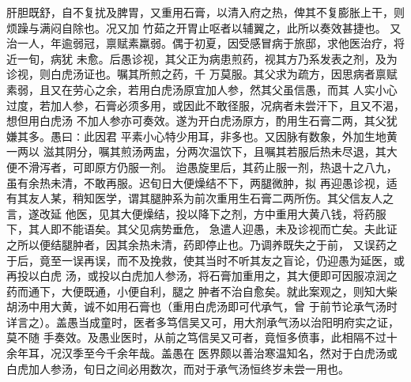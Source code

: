 \documentclass[a4paper,12pt,UTF8,twoside]{ctexbook}
\begin{document}
肝胆既舒，自不复扰及脾胃，又重用石膏，以清入府之热，俾其不复膨胀上干，则烦躁与满闷自除也。况又加 
竹茹之开胃止呕者以辅翼之，此所以奏效甚捷也。 
又治一人，年逾弱冠，禀赋素羸弱。偶于初夏，因受感冒病于旅邸，求他医治疗，将近一旬，病犹 
未愈。后愚诊视，其父正为病患煎药，视其方乃系发表之剂，及为诊视，则白虎汤证也。嘱其所煎之药，千 
万莫服。其父求为疏方，因思病者禀赋素弱，且又在劳心之余，若用白虎汤原宜加人参，然其父虽信愚，而其 
人实小心过度，若加人参，石膏必须多用，或因此不敢径服，况病者未尝汗下，且又不渴，想但用白虎汤 
不加人参亦可奏效。遂为开白虎汤原方，酌用生石膏二两，其父犹嫌其多。愚曰∶此因君 
平素小心特少用耳，非多也。又因脉有数象，外加生地黄一两以 
滋其阴分，嘱其煎汤两盅，分两次温饮下，且嘱其若服后热未尽退，其大便不滑泻者，可即原方仍服一剂。 
迨愚旋里后，其药止服一剂，热退十之八九，虽有余热未清，不敢再服。迟旬日大便燥结不下，两腿微肿，拟 
再迎愚诊视，适有其友人某，稍知医学，谓其腿肿系为前次重用生石膏二两所伤。其父信友人之言，遂改延 
他医，见其大便燥结，投以降下之剂，方中重用大黄八钱，将药服下，其人即不能语矣。其父见病势垂危， 
急遣人迎愚，未及诊视而亡矣。夫此证之所以便结腿肿者，因其余热未清，药即停止也。乃调养既失之于前， 
又误药之于后，竟至一误再误，而不及挽救，使其当时不听其友之盲论，仍迎愚为延医，或再投以白虎 
汤，或投以白虎加人参汤，将石膏加重用之，其大便即可因服凉润之药而通下，大便既通，小便自利，腿之 
肿者不治自愈矣。就此案观之，则知大柴胡汤中用大黄，诚不如用石膏也（重用白虎汤即可代承气，曾 
于前节论承气汤时详言之）。盖愚当成童时，医者多笃信吴又可，用大剂承气汤以治阳明府实之证，莫不随 
手奏效。及愚业医时，从前之笃信吴又可者，竟恒多偾事，此相隔不过十余年耳，况汉季至今千余年哉。盖愚在 
医界颇以善治寒温知名，然对于白虎汤或白虎加人参汤，旬日之间必用数次，而对于承气汤恒终岁未尝一用也。 
\end{document}
